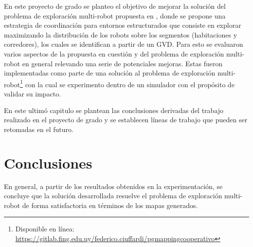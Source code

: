 En este proyecto de grado se planteo el objetivo de mejorar la solución del
problema de exploración multi-robot propuesta en \cite{wurm2008coordinated},
donde se propone una estrategia de coordinación para  entornos estructurados
que consiste en explorar maximizando la distribución de los robots sobre los
segmentos (habitaciones y corredores), los cuales se identifican a partir de un
GVD. Para esto se evaluaron varios aspectos de la propuesta en cuestión y del
problema de exploración multi-robot en general relevando una serie de
potenciales mejoras. Estas fueron implementadas como parte de una solución al
problema de exploración multi-robot\footnote{Disponible en línea:\\
\url{https://gitlab.fing.edu.uy/federico.ciuffardi/pgmappingcooperativo}} con
la cual se experimento dentro de un simulador con el propósito de validar su
impacto.

En este ultimó capitulo se plantean las conclusiones derivadas del trabajo
realizado en el proyecto de grado y se establecen líneas de trabajo que pueden ser
retomadas en el futuro.

\section{Conclusiones}


En general, a partir de los resultados obtenidos en la experimentación, se
concluye que la solución desarrollada resuelve el problema de exploración
multi-robot de forma satisfactoria en términos de los mapas generados. 

